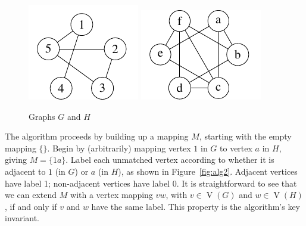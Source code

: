 \documentclass[letterpaper]{article}
\DeclareMathOperator{\V}{V}
\newcommand{\examplexG}[5] {
    \begin{minipage}{.2\textwidth}
    \tikz {
        \graph [nodes={draw, circle, minimum width=.6cm}, circular placement, radius=1cm,
                clockwise=5] {
                    1[label=90:#1],2[label=0:#2],3[label=0:#3],4[label=180:#4],5[label=180:#5];
            1--4; 1--5; 2--3; 2--5; 3--5;
        };
    }
    \end{minipage}
}
\newcommand{\examplexH}[6] {
    \begin{minipage}{.2\textwidth}
    \tikz {
        \graph [nodes={draw, circle, minimum width=.6cm}, circular placement, radius=1.1cm,
                clockwise=6, phase=60] {
                    a[label=0:#1],b[label=0:#2],c[label=0:#3],d[label=180:#4],e[label=180:#5],f[label=180:#6];
            a--b; a--c; a--e; b--d; b--f; c--d; c--e; c--f; d--f; e--f;
        };
    }
    \end{minipage}
}
\begin{document}
\begin{figure}[ht]
\centering
    \includegraphics{graph_G}
    \includegraphics{graph_H}
\caption{Graphs $G$ and $H$}
\label{fig:alg1}
\end{figure}

The algorithm proceeds by building up a mapping $M$, starting with the empty
mapping $\{\}$. Begin by (arbitrarily) mapping vertex $1$ in $G$ to vertex $a$
in $H$, giving $M=\{1a\}$.  Label each unmatched vertex according to whether it
is adjacent to $1$ (in $G$) or $a$ (in $H$), as shown in Figure~\ref{fig:alg2}.
Adjacent vertices have label 1; non-adjacent vertices have label 0.  It is
straightforward to see that we can extend $M$ with a vertex mapping $vw$, with
$v \in \V(G)$ and $w \in \V(H)$, if and only if $v$ and $w$ have the same label.  This
property is the algorithm's key invariant.
\end{document}
